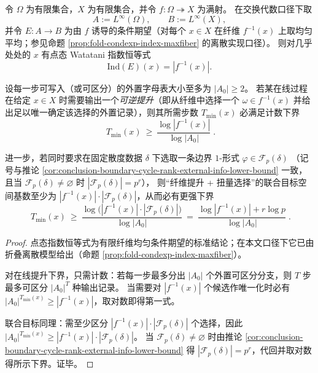 \begin{proposition}\label{prop:conclusion-index-torsion-time-lower-bound}
令 \(\Omega\) 为有限集合，\(X\) 为有限集合，并令 \(f:\Omega\twoheadrightarrow X\) 为满射。
在交换代数口径下取
\[
A:=L^\infty(\Omega),\qquad B:=L^\infty(X),
\]
并令 \(E:A\to B\) 为由 \(f\) 诱导的条件期望（对每个 \(x\in X\) 在纤维 \(f^{-1}(x)\) 上取均匀平均；参见命题 \ref{prop:fold-condexp-index-maxfiber} 的离散实现口径）。
则对几乎处处的 \(x\) 有点态 Watatani 指数恒等式
\[
\mathrm{Ind}(E)(x)=|f^{-1}(x)|.
\]
\par
设每一步可写入（或可区分）的外置字母表大小至多为 \(|A_0|\ge 2\)。
若某在线过程在给定 \(x\in X\) 时需要输出一个\emph{可逆提升}（即从纤维中选择一个 \(\omega\in f^{-1}(x)\) 并给出足以唯一确定该选择的外置记录），则其所需步数 \(T_{\min}(x)\) 必满足计数下界
\[
\boxed{\;
T_{\min}(x)\ \ge\ \frac{\log |f^{-1}(x)|}{\log |A_0|}\; }.
\]
\par
进一步，若同时要求在固定散度数据 \(\delta\) 下选取一条边界 \(1\)-形式
\(\varphi\in\mathcal F_p(\delta)\)
（记号与推论 \ref{cor:conclusion-boundary-cycle-rank-external-info-lower-bound} 一致，且当 \(\mathcal F_p(\delta)\neq\varnothing\) 时 \(|\mathcal F_p(\delta)|=p^r\)），
则“纤维提升 + 扭量选择”的联合目标空间基数至少为 \(|f^{-1}(x)|\cdot |\mathcal F_p(\delta)|\)，从而必有更强下界
\[
\boxed{\;
T_{\min}(x)\ \ge\ \frac{\log\bigl(|f^{-1}(x)|\cdot |\mathcal F_p(\delta)|\bigr)}{\log |A_0|}
\ =\ \frac{\log|f^{-1}(x)|+r\log p}{\log |A_0|}\; }.
\]
\end{proposition}
\begin{proof}
点态指数恒等式为有限纤维均匀条件期望的标准结论；在本文口径下它已由折叠离散模型给出（命题 \ref{prop:fold-condexp-index-maxfiber}）。
\par
对在线提升下界，只需计数：若每一步最多分出 \(|A_0|\) 个外置可区分分支，则 \(T\) 步最多可区分 \(|A_0|^T\) 种输出记录。
当需要对 \(|f^{-1}(x)|\) 个候选作唯一化时必有 \(|A_0|^{T_{\min}(x)}\ge |f^{-1}(x)|\)，取对数即得第一式。
\par
联合目标同理：需至少区分 \(|f^{-1}(x)|\cdot |\mathcal F_p(\delta)|\) 个选择，因此 \(|A_0|^{T_{\min}(x)}\ge |f^{-1}(x)|\cdot |\mathcal F_p(\delta)|\)。
当 \(\mathcal F_p(\delta)\neq\varnothing\) 时由推论 \ref{cor:conclusion-boundary-cycle-rank-external-info-lower-bound} 得 \(|\mathcal F_p(\delta)|=p^r\)，代回并取对数得所示下界。证毕。
\end{proof}

\endinput
